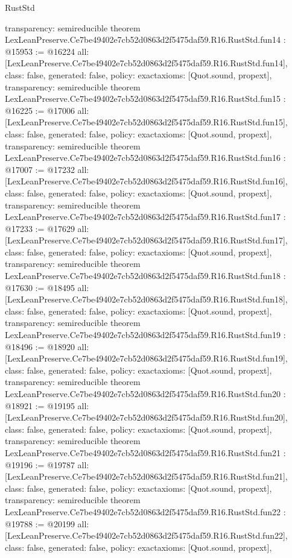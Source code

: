 \begin{lexlean}{RustStd}
\begin{coremodule}
{  transparency: semireducible
}
theorem LexLeanPreserve.Ce7be49402e7cb52d0863d2f5475daf59.R16.RustStd.fun14 : @15953 := @16224 {
  all: [LexLeanPreserve.Ce7be49402e7cb52d0863d2f5475daf59.R16.RustStd.fun14],
  class: false,
  generated: false,
  policy: exact{axioms: [Quot.sound, propext]},
  transparency: semireducible
}
theorem LexLeanPreserve.Ce7be49402e7cb52d0863d2f5475daf59.R16.RustStd.fun15 : @16225 := @17006 {
  all: [LexLeanPreserve.Ce7be49402e7cb52d0863d2f5475daf59.R16.RustStd.fun15],
  class: false,
  generated: false,
  policy: exact{axioms: [Quot.sound, propext]},
  transparency: semireducible
}
theorem LexLeanPreserve.Ce7be49402e7cb52d0863d2f5475daf59.R16.RustStd.fun16 : @17007 := @17232 {
  all: [LexLeanPreserve.Ce7be49402e7cb52d0863d2f5475daf59.R16.RustStd.fun16],
  class: false,
  generated: false,
  policy: exact{axioms: [Quot.sound, propext]},
  transparency: semireducible
}
theorem LexLeanPreserve.Ce7be49402e7cb52d0863d2f5475daf59.R16.RustStd.fun17 : @17233 := @17629 {
  all: [LexLeanPreserve.Ce7be49402e7cb52d0863d2f5475daf59.R16.RustStd.fun17],
  class: false,
  generated: false,
  policy: exact{axioms: [Quot.sound, propext]},
  transparency: semireducible
}
theorem LexLeanPreserve.Ce7be49402e7cb52d0863d2f5475daf59.R16.RustStd.fun18 : @17630 := @18495 {
  all: [LexLeanPreserve.Ce7be49402e7cb52d0863d2f5475daf59.R16.RustStd.fun18],
  class: false,
  generated: false,
  policy: exact{axioms: [Quot.sound, propext]},
  transparency: semireducible
}
theorem LexLeanPreserve.Ce7be49402e7cb52d0863d2f5475daf59.R16.RustStd.fun19 : @18496 := @18920 {
  all: [LexLeanPreserve.Ce7be49402e7cb52d0863d2f5475daf59.R16.RustStd.fun19],
  class: false,
  generated: false,
  policy: exact{axioms: [Quot.sound, propext]},
  transparency: semireducible
}
theorem LexLeanPreserve.Ce7be49402e7cb52d0863d2f5475daf59.R16.RustStd.fun20 : @18921 := @19195 {
  all: [LexLeanPreserve.Ce7be49402e7cb52d0863d2f5475daf59.R16.RustStd.fun20],
  class: false,
  generated: false,
  policy: exact{axioms: [Quot.sound, propext]},
  transparency: semireducible
}
theorem LexLeanPreserve.Ce7be49402e7cb52d0863d2f5475daf59.R16.RustStd.fun21 : @19196 := @19787 {
  all: [LexLeanPreserve.Ce7be49402e7cb52d0863d2f5475daf59.R16.RustStd.fun21],
  class: false,
  generated: false,
  policy: exact{axioms: [Quot.sound, propext]},
  transparency: semireducible
}
theorem LexLeanPreserve.Ce7be49402e7cb52d0863d2f5475daf59.R16.RustStd.fun22 : @19788 := @20199 {
  all: [LexLeanPreserve.Ce7be49402e7cb52d0863d2f5475daf59.R16.RustStd.fun22],
  class: false,
  generated: false,
  policy: exact{axioms: [Quot.sound, propext]},
}
\end{coremodule}
\end{lexlean}
